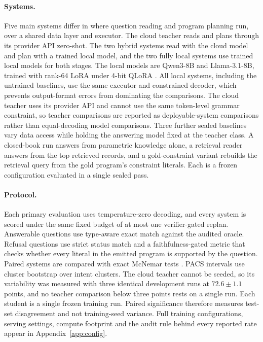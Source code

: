 \documentclass{article}
\begin{document}
\paragraph{Systems.}
Five main systems differ in where question reading and program planning
run, over a shared data layer and executor. The cloud teacher reads and
plans through its provider API zero-shot. The two hybrid systems read with
the cloud model and plan with a trained local model, and the two fully
local systems use trained local models for both stages. The local models
are Qwen3-8B and Llama-3.1-8B, trained with rank-64 LoRA under 4-bit QLoRA
\citep{hu2022lora,dettmers2023qlora}. All local systems, including the untrained baselines, use the same executor
and constrained decoder, which prevents output-format errors from dominating
the comparisons. The cloud teacher uses its provider API and
cannot use the same token-level grammar constraint, so teacher comparisons are
reported as deployable-system comparisons rather than equal-decoding model
comparisons. Three further sealed baselines vary data access while holding the
answering model fixed at the teacher class. A closed-book run answers from
parametric knowledge alone, a retrieval reader answers from the top retrieved
records, and a gold-constraint variant rebuilds the retrieval query from the
gold program's constraint literals. Each is a frozen configuration evaluated
in a single sealed pass.

\paragraph{Protocol.}
Each primary evaluation uses temperature-zero decoding, and every system
is scored under the same fixed budget of at most one verifier-gated
replan.
Answerable questions use type-aware exact match against the audited oracle.
Refusal questions use strict status match and a faithfulness-gated metric that
checks whether every literal in the emitted program is supported by the
question. Paired systems are compared with exact McNemar tests
\citep{mcnemar1947note}. PACS intervals use cluster bootstrap over intent
clusters. The cloud teacher cannot be seeded, so its variability was measured
with three identical development runs at $72.6\pm1.1$ points, and no teacher
comparison below three points rests on a single run. Each student is a
single frozen training run. Paired significance therefore measures test-set
disagreement and not training-seed variance. Full training configurations,
serving settings, compute footprint and the audit rule behind every
reported rate appear in Appendix~\ref{app:config}.
\end{document}
